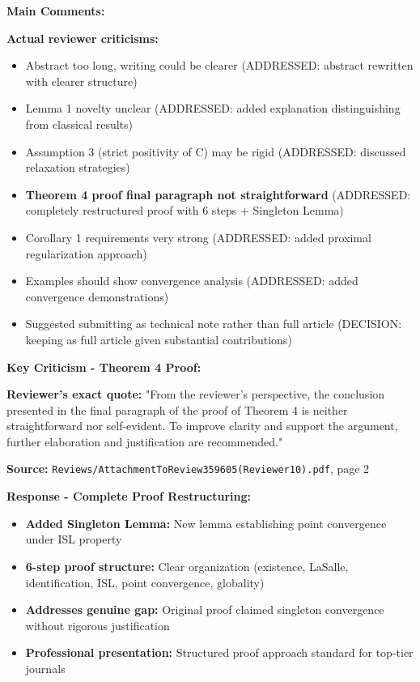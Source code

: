 \documentclass[11pt]{article}
\begin{document}
\textbf{Main Comments:}

\textbf{Actual reviewer criticisms:}
\begin{itemize}[leftmargin=*]
\item Abstract too long, writing could be clearer (ADDRESSED: abstract rewritten with clearer structure)
\item Lemma 1 novelty unclear (ADDRESSED: added explanation distinguishing from classical results)
\item Assumption 3 (strict positivity of C) may be rigid (ADDRESSED: discussed relaxation strategies)
\item \textbf{Theorem 4 proof final paragraph not straightforward} (ADDRESSED: completely restructured proof with 6 steps + Singleton Lemma)
\item Corollary 1 requirements very strong (ADDRESSED: added proximal regularization approach)
\item Examples should show convergence analysis (ADDRESSED: added convergence demonstrations)
\item Suggested submitting as technical note rather than full article (DECISION: keeping as full article given substantial contributions)
\end{itemize}

\textbf{Key Criticism - Theorem 4 Proof:}

\textbf{Reviewer's exact quote:} "From the reviewer's perspective, the conclusion presented in the final paragraph of the proof of Theorem 4 is neither straightforward nor self-evident. To improve clarity and support the argument, further elaboration and justification are recommended."

\textbf{Source:} \texttt{Reviews/AttachmentToReview359605(Reviewer10).pdf}, page 2

\textbf{Response - Complete Proof Restructuring:}
\begin{itemize}[leftmargin=*]
\item \textbf{Added Singleton Lemma:} New lemma establishing point convergence under ISL property
\item \textbf{6-step proof structure:} Clear organization (existence, LaSalle, identification, ISL, point convergence, globality)
\item \textbf{Addresses genuine gap:} Original proof claimed singleton convergence without rigorous justification
\item \textbf{Professional presentation:} Structured proof approach standard for top-tier journals
\end{itemize}
\end{document}
